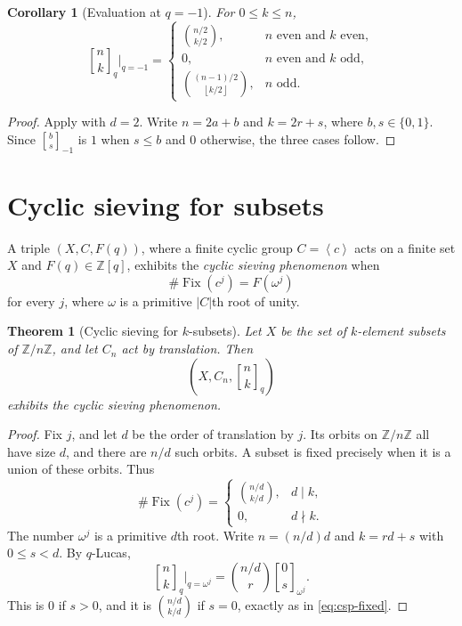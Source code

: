 \documentclass[11pt,oneside,openany]{book}
\newtheorem{theorem}{Theorem}[chapter]
\newtheorem{corollary}[corollary]{Corollary}
\theoremstyle{definition}
\theoremstyle{remark}
\newcommand{\qbinom}[2]{\genfrac{[}{]}{0pt}{}{#1}{#2}_{q}}
\newcommand{\Qbinom}[3]{\genfrac{[}{]}{0pt}{}{#1}{#2}_{#3}}
\newcommand{\Z}{\mathbb Z}
\newcommand{\abs}[1]{\lvert #1\rvert}
\newcommand{\floor}[1]{\left\lfloor #1\right\rfloor}
\newcommand{\angles}[1]{\left\langle#1\right\rangle}
\begin{document}
\begin{corollary}[Evaluation at $q=-1$]\label{cor:qminusone}
For $0\le k\le n$,
\[
 \qbinom nk\bigg|_{q=-1}
 =\begin{cases}
 \displaystyle\binom{n/2}{k/2},&n\text{ even and }k\text{ even},\\[7pt]
 0,&n\text{ even and }k\text{ odd},\\[7pt]
 \displaystyle\binom{(n-1)/2}{\floor{k/2}},&n\text{ odd}.
 \end{cases}
\]
\end{corollary}

\begin{proof}
Apply  with $d=2$.  Write $n=2a+b$ and $k=2r+s$, where $b,s\in\{0,1\}$.  Since $\Qbinom bs{-1}$ is $1$ when $s\le b$ and $0$ otherwise, the three cases follow.
\end{proof}

\section{Cyclic sieving for subsets}

A triple $(X,C,F(q))$, where a finite cyclic group $C=\angles c$ acts on a finite set $X$ and $F(q)\in\Z[q]$, exhibits the \emph{cyclic sieving phenomenon} when
\[
 \#\operatorname{Fix}(c^j)=F(\omega^j)
\]
for every $j$, where $\omega$ is a primitive $\abs C$th root of unity.

\begin{theorem}[Cyclic sieving for $k$-subsets]\label{thm:csp-subsets}
Let $X$ be the set of $k$-element subsets of $\Z/n\Z$, and let $C_n$ act by translation.  Then
\[
 \left(X,C_n,\qbinom nk\right)
\]
exhibits the cyclic sieving phenomenon.
\end{theorem}

\begin{proof}
Fix $j$, and let $d$ be the order of translation by $j$.  Its orbits on $\Z/n\Z$ all have size $d$, and there are $n/d$ such orbits.  A subset is fixed precisely when it is a union of these orbits.  Thus
\[
 \#\operatorname{Fix}(c^j)
 =\begin{cases}
 \displaystyle\binom{n/d}{k/d},&d\mid k,\\
 0,&d\nmid k.
 \end{cases}
 \tag{16.8}\label{eq:csp-fixed}
\]
The number $\omega^j$ is a primitive $d$th root.  Write $n=(n/d)d$ and $k=rd+s$ with $0\le s<d$.  By $q$-Lucas,
\[
 \qbinom nk\bigg|_{q=\omega^j}
 =\binom{n/d}{r}\Qbinom 0s{\omega^j}.
\]
This is $0$ if $s>0$, and it is $\binom{n/d}{k/d}$ if $s=0$, exactly as in \eqref{eq:csp-fixed}.
\end{proof}
\end{document}

